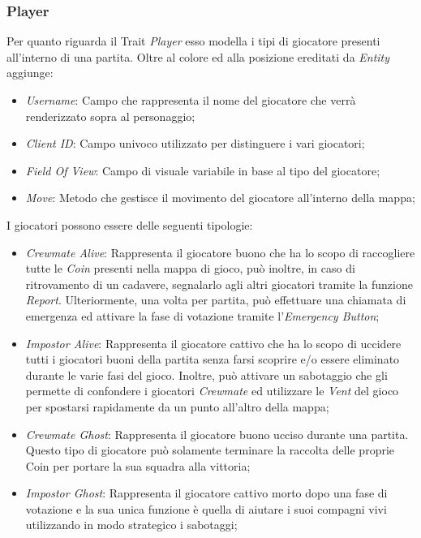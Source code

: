 \subsubsection{Player}
Per quanto riguarda il Trait \textit{Player} esso modella i tipi di giocatore presenti all'interno di una partita. Oltre al colore ed alla posizione ereditati da \textit{Entity} aggiunge:
\begin{itemize}
    \item \textit{Username}: Campo che rappresenta il nome del giocatore che verr\`a renderizzato sopra al personaggio;
    \item \textit{Client ID}: Campo univoco utilizzato per distinguere i vari giocatori;
    \item \textit{Field Of View}: Campo di visuale variabile in base al tipo del giocatore;
    \item \textit{Move}: Metodo che gestisce il movimento del giocatore all'interno della mappa;
\end{itemize}
I giocatori possono essere delle seguenti tipologie:
\begin{itemize}
    \item \textit{Crewmate Alive}: Rappresenta il giocatore buono che ha lo scopo di raccogliere tutte le \textit{Coin} presenti nella mappa di gioco, pu\`o inoltre, in caso di ritrovamento di un cadavere, segnalarlo agli altri giocatori tramite la funzione \textit{Report}. Ulteriormente, una volta per partita, pu\`o effettuare una chiamata di emergenza ed attivare la fase di votazione tramite l'\textit{Emergency Button};
    \item \textit{Impostor Alive}: Rappresenta il giocatore cattivo che ha lo scopo di uccidere tutti i giocatori buoni della partita senza farsi scoprire e/o essere eliminato durante le varie fasi del gioco. Inoltre, pu\`o attivare un sabotaggio che gli permette di confondere i giocatori \textit{Crewmate} ed utilizzare le \textit{Vent} del gioco per spostarsi rapidamente da un punto all'altro della mappa;
    \item \textit{Crewmate Ghost}: Rappresenta il giocatore buono ucciso durante una partita. Questo tipo di giocatore pu\`o solamente terminare la raccolta delle proprie Coin per portare la sua squadra alla vittoria;
    \item \textit{Impostor Ghost}: Rappresenta il giocatore cattivo morto dopo una fase di votazione e la sua unica funzione \`e quella di aiutare i suoi compagni vivi utilizzando in modo strategico i sabotaggi;
\end{itemize}

